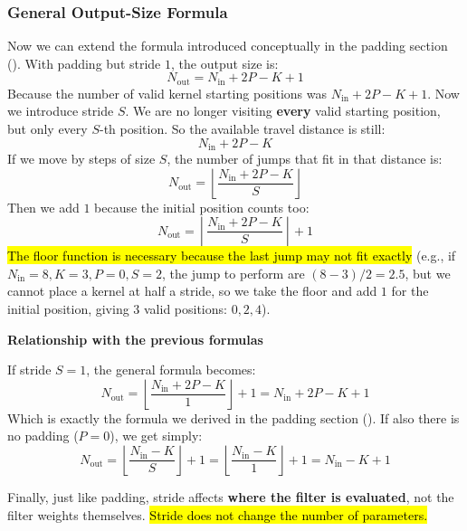 \subsubsection{General Output-Size Formula}\label{sec:general-output-size-formula}

Now we can extend the formula introduced conceptually in the padding section (). With padding but stride $1$, the output size is:
\begin{equation*}
    N_{\text{out}} = N_{\text{in}} + 2P - K + 1
\end{equation*}
Because the number of valid kernel starting positions was $N_{\text{in}} + 2P - K + 1$. Now we introduce stride $S$. We are no longer visiting \textbf{every} valid starting position, but only every $S$-th position. So the available travel distance is still:
\begin{equation*}
    N_{\text{in}} + 2P - K
\end{equation*}
If we move by steps of size $S$, the number of jumps that fit in that distance is:
\begin{equation*}
    N_{\text{out}} = \left\lfloor \frac{N_{\text{in}} + 2P - K}{S} \right\rfloor
\end{equation*}
Then we add $1$ because the initial position counts too:
\begin{equation}\label{eq:output-size-convolution-stride-general}
    N_{\text{out}} = \left\lfloor \frac{N_{\text{in}} + 2P - K}{S} \right\rfloor + 1
\end{equation}
\hl{The floor function is necessary because the last jump may not fit exactly} (e.g., if $N_{\text{in}}=8, K=3, P=0, S=2$, the jump to perform are $(8-3) / 2 = 2.5$, but we cannot place a kernel at half a stride, so we take the floor and add $1$ for the initial position, giving $3$ valid positions: $0, 2, 4$).

\highspace
\begin{flushleft}
    \textcolor{Green3}{ \textbf{Relationship with the previous formulas}}
\end{flushleft}
If stride $S=1$, the general formula becomes:
\begin{equation*}
    N_{\text{out}} = \left\lfloor \frac{N_{\text{in}} + 2P - K}{1} \right\rfloor + 1 = N_{\text{in}} + 2P - K + 1
\end{equation*}
Which is exactly the formula we derived in the padding section (). If also there is no padding ($P=0$), we get simply:
\begin{equation*}
    N_{\text{out}} = \left\lfloor \frac{N_{\text{in}} - K}{S} \right\rfloor + 1 = \left\lfloor \frac{N_{\text{in}} - K}{1} \right\rfloor + 1 = N_{\text{in}} - K + 1
\end{equation*}

\highspace
\textcolor{Red2}{} Finally, just like padding, stride affects \textbf{where the filter is evaluated}, not the filter weights themselves. \hl{Stride does not change the number of parameters.}